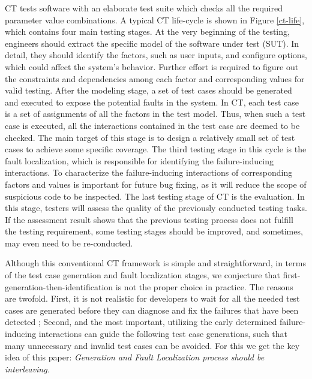 \documentclass[journal,12pt,onecolumn,draftclsnofoot,]{IEEEtran}
\begin{document}
CT tests software with an elaborate test suite which checks all the required parameter value combinations. A typical CT life-cycle is shown in Figure \ref{ct-life}, which contains four main testing stages. At the very beginning of the testing, engineers should extract the specific model of the software under test (SUT). In detail, they should identify the factors, such as user inputs, and configure options, which could affect the system's behavior. Further effort is required to figure out the constraints and dependencies among each factor and corresponding values for valid testing. After the modeling stage, a set of test cases should be generated and executed to expose the potential faults in the system. In CT, each test case is a set of assignments of all the factors in the test model. Thus, when such a test case is executed, all the interactions contained in the test case are deemed to be checked. The main target of this stage is to design a relatively small set of test cases to achieve some specific coverage. The third testing stage in this cycle is the fault localization, which is responsible for identifying the failure-inducing interactions. To characterize the failure-inducing interactions of corresponding factors and values is important for future bug fixing, as it will reduce the scope of suspicious code to be inspected. The last testing stage of CT is the evaluation. In this stage, testers will assess the quality of the previously conducted testing tasks. If the assessment result shows that the previous testing process does not fulfill the testing requirement, some testing stages should be improved, and sometimes, may even need to be re-conducted.


Although this conventional CT framework is simple and straightforward, in terms of the test case generation and fault localization stages, we conjecture that first-generation-then-identification is not the proper choice in practice. The reasons are twofold. First, it is not realistic for developers to wait for all the needed test cases are generated before they can diagnose and fix the failures that have been detected \cite{yoo2013fault}; Second, and the most important, utilizing the early determined failure-inducing interactions can guide the following test case generations, such that many unnecessary and invalid test cases can be avoided. For this we get the key idea of this paper: \emph{Generation and Fault Localization process should be interleaving.}
\end{document}
